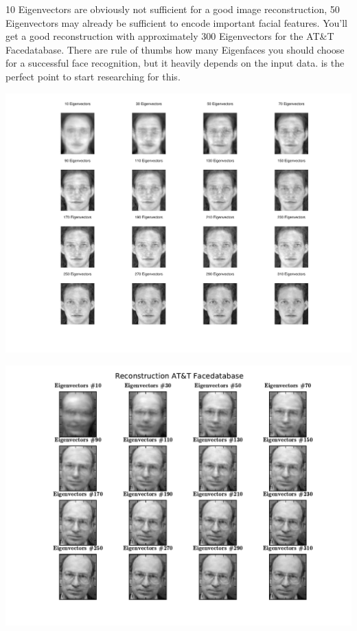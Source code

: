 10 Eigenvectors are obviously not sufficient for a good image reconstruction, 50 Eigenvectors may already be sufficient to encode important facial features. You'll get a good reconstruction with approximately 300 Eigenvectors for the AT\&T Facedatabase. There are rule of thumbs how many Eigenfaces you should choose for a successful face recognition, but it heavily depends on the input data. \cite{zhao2003frl} is the perfect point to start researching for this.

\ifx\python\undefined
	\begin{center}
		\includegraphics[scale=0.6]{img/eigenfaces/octave_pca_reconstruction}
	\end{center}
\else
	\begin{center}
		\includegraphics[scale=0.6]{img/eigenfaces/python_pca_reconstruction}
	\end{center}
\fi

